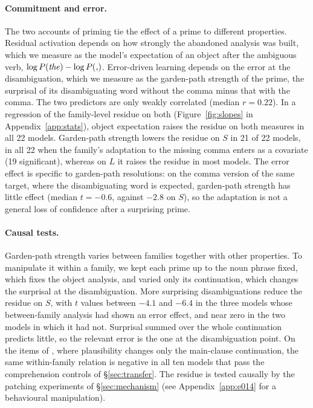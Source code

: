 \documentclass[11pt]{article}
\newcommand{\ex}[1]{\textit{#1}}
\begin{document}
\paragraph{Commitment and error.}
The two accounts of priming tie the effect of a prime to different properties.
Residual activation depends on how strongly the abandoned analysis was built, which we measure as the model's expectation of an object after the ambiguous verb, $\log P(\text{\ex{the}}) - \log P(\text{\ex{,}})$.
Error-driven learning depends on the error at the disambiguation, which we measure as the garden-path strength of the prime, the surprisal of its disambiguating word without the comma minus that with the comma.
The two predictors are only weakly correlated (median $r=0.22$).
In a regression of the family-level residue on both (Figure~\ref{fig:slopes} in Appendix~\ref{app:stats}), object expectation raises the residue on both measures in all 22 models.
Garden-path strength lowers the residue on $S$ in 21 of 22 models, in all 22 when the family's adaptation to the missing comma enters as a covariate (19 significant), whereas on $L$ it raises the residue in most models.
The error effect is specific to garden-path resolutions: on the comma version of the same target, where the disambiguating word is expected, garden-path strength has little effect (median $t=-0.6$, against $-2.8$ on $S$), so the adaptation is not a general loss of confidence after a surprising prime.

\paragraph{Causal tests.}
Garden-path strength varies between families together with other properties.
To manipulate it within a family, we kept each prime up to the noun phrase fixed, which fixes the object analysis, and varied only its continuation, which changes the surprisal at the disambiguation.
More surprising disambiguations reduce the residue on $S$, with $t$ values between $-4.1$ and $-6.4$ in the three models whose between-family analysis had shown an error effect, and near zero in the two models in which it had not.
Surprisal summed over the whole continuation predicts little, so the relevant error is the one at the disambiguation point.
On the items of \citet{christianson2001}, where plausibility changes only the main-clause continuation, the same within-family relation is negative in all ten models that pass the comprehension controls of \S\ref{sec:transfer}.
The residue is tested causally by the patching experiments of \S\ref{sec:mechanism} (see Appendix~\ref{app:e014} for a behavioural manipulation).
\end{document}
